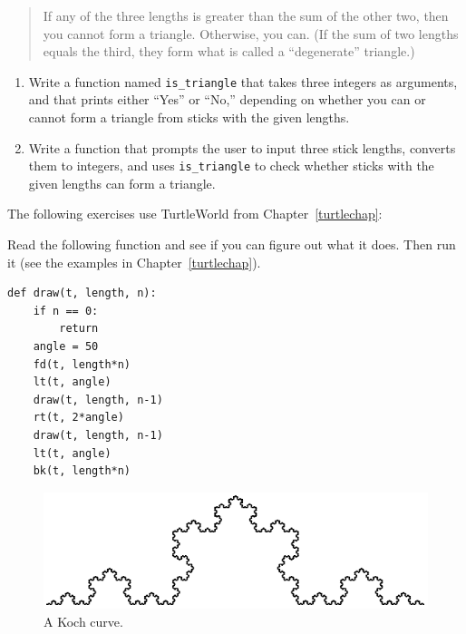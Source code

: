 \documentclass[10pt]{book}
\begin{document}
\begin{CJK}{UTF8}{gbsn}
\begin{exercise}
\begin{quotation}
If any of the three lengths is greater than the sum of the other
  two, then you cannot form a triangle.  Otherwise, you
  can.  (If the sum of two lengths equals the third, they form
    what is called a ``degenerate'' triangle.)
\end{quotation}

\begin{enumerate}

\item Write a function named \verb"is_triangle" that takes three
  integers as arguments, and that prints either ``Yes'' or ``No,'' depending
  on whether you can or cannot form a triangle from sticks with the
  given lengths.

\item Write a function that prompts the user to input three stick
  lengths, converts them to integers, and uses \verb"is_triangle" to
  check whether sticks with the given lengths can form a triangle.

\end{enumerate}

\end{exercise}

The following exercises use TurtleWorld from Chapter~\ref{turtlechap}:

\begin{exercise}

Read the following function and see if you can figure out
what it does.  Then run it (see the examples in Chapter~\ref{turtlechap}).

\begin{verbatim}
def draw(t, length, n):
    if n == 0:
        return
    angle = 50
    fd(t, length*n)
    lt(t, angle)
    draw(t, length, n-1)
    rt(t, 2*angle)
    draw(t, length, n-1)
    lt(t, angle)
    bk(t, length*n)
\end{verbatim}

\end{exercise}


\begin{figure}
\centerline
{\includegraphics[scale=0.8]{figs/koch.pdf}}
\caption{A Koch curve.}
\label{fig.koch}
\end{figure}


\end{CJK}
\end{document}
